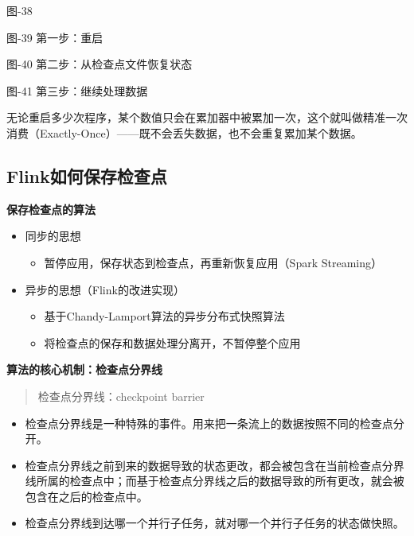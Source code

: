 图-38

图-39 第一步：重启

图-40 第二步：从检查点文件恢复状态

图-41 第三步：继续处理数据

无论重启多少次程序，某个数值只会在累加器中被累加一次，这个就叫做{精准一次消费（Exactly-Once）}------既不会丢失数据，也不会重复累加某个数据。

\hypertarget{flinkux5982ux4f55ux4fddux5b58ux68c0ux67e5ux70b9}{%
\subsection{Flink如何保存检查点}\label{flinkux5982ux4f55ux4fddux5b58ux68c0ux67e5ux70b9}}

\textbf{保存检查点的算法}

\begin{itemize}
\tightlist
\item
  同步的思想

  \begin{itemize}
  \tightlist
  \item
    暂停应用，保存状态到检查点，再重新恢复应用（Spark Streaming）
  \end{itemize}
\item
  异步的思想（Flink的改进实现）

  \begin{itemize}
  \tightlist
  \item
    基于Chandy-Lamport算法的异步分布式快照算法
  \item
    将检查点的保存和数据处理分离开，不暂停整个应用
  \end{itemize}
\end{itemize}

\textbf{算法的核心机制：检查点分界线}

\begin{quote}
检查点分界线：checkpoint barrier
\end{quote}

\begin{itemize}
\tightlist
\item
  检查点分界线是一种{特殊的事件}。用来把一条流上的数据按照不同的检查点分开。
\item
  检查点分界线之前到来的数据导致的状态更改，都会被包含在当前检查点分界线所属的检查点中；而基于检查点分界线之后的数据导致的所有更改，就会被包含在之后的检查点中。
\item
  检查点分界线到达哪一个并行子任务，就对哪一个并行子任务的状态做快照。
\end{itemize}

